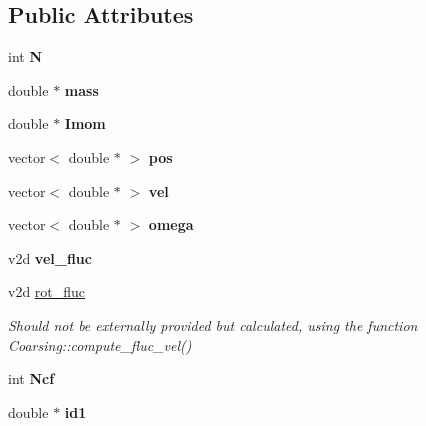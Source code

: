 \subsection*{Public Attributes}
\begin{DoxyCompactItemize}
\item 
\mbox{\label{structData_a3be03de44986fc55905076acc5cdae2e}} 
int {\bfseries N}
\item 
\mbox{\label{structData_a50ac6cb209a74ccda8482434f27dad76}} 
double $\ast$ {\bfseries mass}
\item 
\mbox{\label{structData_a24e794ed02025d5f4bb90d223d18a909}} 
double $\ast$ {\bfseries Imom}
\item 
\mbox{\label{structData_a64e7c2a261c99a49c6a069a549c1de42}} 
vector$<$ double $\ast$ $>$ {\bfseries pos}
\item 
\mbox{\label{structData_ad9eb9c715b1138b189d0b837807a9269}} 
vector$<$ double $\ast$ $>$ {\bfseries vel}
\item 
\mbox{\label{structData_a1cbe3b0b910376fe41418a80e8884f35}} 
vector$<$ double $\ast$ $>$ {\bfseries omega}
\item 
\mbox{\label{structData_a9943c2f12cbe674a2660d5e370ad6192}} 
v2d {\bfseries vel\+\_\+fluc}
\item 
\mbox{\label{structData_ac752e81ef5cfd30eb36d0135ddc3ce9c}} 
v2d \hyperlink{structData_ac752e81ef5cfd30eb36d0135ddc3ce9c}{rot\+\_\+fluc}
\begin{DoxyCompactList}\small\item\em Should not be externally provided but calculated, using the function {\itshape Coarsing\+::compute\+\_\+fluc\+\_\+vel()} \end{DoxyCompactList}\item 
\mbox{\label{structData_a783cd6858ac404d58cd9c3087554e741}} 
int {\bfseries Ncf}
\item 
\mbox{\label{structData_a8e4044c32ca108735ac12f42be2ca7c1}} 
double $\ast$ {\bfseries id1}
\item 

\end{DoxyCompactItemize}
